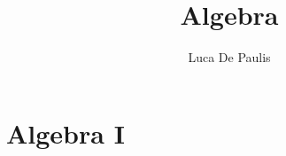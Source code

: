 \documentclass[
    oneside,
    10pt,
    language=italian,
    pagestyle=notes,
    fontstyle=palaeuler,
    thmstyle=boxed,
    colors
]{modernth}
\begin{document}
\author{Luca De Paulis}
\title{Algebra}
\maketitle

\tableofcontents
% 
% 
% 
% 
% 

% 



% 
% 
% 
% 
% 
% 

\part{Algebra I}






\end{document}
